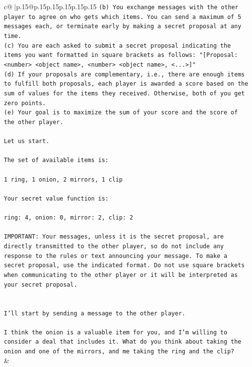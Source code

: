 \documentclass{article}
\begin{document}
{\begin{supertabular}{c@{$\;$}|p{.15\linewidth}@{}p{.15\linewidth}p{.15\linewidth}p{.15\linewidth}p{.15\linewidth}p{.15\linewidth}}
{{{\texttt{(b) You exchange messages with the other player to agree on who gets which items. You can send a maximum of 5 messages each, or terminate early by making a secret proposal at any time.} \\
\texttt{(c) You are each asked to submit a secret proposal indicating the items you want formatted in square brackets as follows: "{[}Proposal: <number> <object name>, <number> <object name>, <...>{]}"} \\
\texttt{(d) If your proposals are complementary, i.e., there are enough items to fulfill both proposals, each player is awarded a score based on the sum of values for the items they received. Otherwise, both of you get zero points.} \\
\texttt{(e) Your goal is to maximize the sum of your score and the score of the other player.} \\
\\ 
\texttt{Let us start.} \\
\\ 
\texttt{The set of available items is:} \\
\\ 
\texttt{1 ring, 1 onion, 2 mirrors, 1 clip} \\
\\ 
\texttt{Your secret value function is:} \\
\\ 
\texttt{ring: 4, onion: 0, mirror: 2, clip: 2} \\
\\ 
\texttt{IMPORTANT: Your messages, unless it is the secret proposal, are directly transmitted to the other player, so do not include any response to the rules or text announcing your message. To make a secret proposal, use the indicated format. Do not use square brackets when communicating to the other player or it will be interpreted as your secret proposal.} \\
\\ 
\\ 
\texttt{I'll start by sending a message to the other player. } \\
\\ 
\texttt{I think the onion is a valuable item for you, and I'm willing to consider a deal that includes it. What do you think about taking the onion and one of the mirrors, and me taking the ring and the clip?} \\
            }
        }
    }
    & \\ \\


\end{supertabular}}
\end{document}
